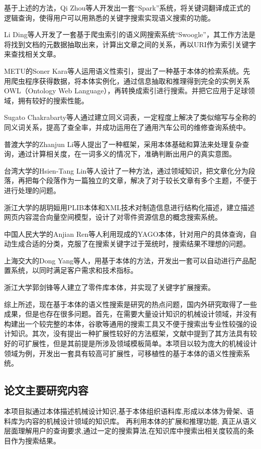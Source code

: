 \documentclass[12pt,a4paper]{article}
\begin{document}
	基于上述的方法，Qi Zhou\cite{14}等人开发出一套“Spark”系统，将关键词翻译成正式的逻辑查询，使得用户可以用熟悉的关键字搜索实现语义搜索的功能。

	Li Ding\cite{15}等人开发了一套基于爬虫索引的语义网搜索系统“Swoogle”，其工作方法是将找到文档的元数据抽取出来，计算出文章之间的关系，再以URI作为索引关键字来查找相关文章。

	METU的Soner Kara\cite{16}等人运用语义性索引，提出了一种基于本体的检索系统。先用爬虫程序获得数据，将本体实例化，通过信息抽取和推理得到完全的实例关系OWL（Ontology Web Language），再转换成索引进行搜索。并把它应用于足球领域，拥有较好的搜索性能。

	Sugato Chakrabarty\cite{17}等人通过建立同义词表，一定程度上解决了类似缩写与全称的同义词关系，提高了查全率，并成功运用在了通用汽车公司的维修查询系统中。

	普渡大学的Zhanjun Li\cite{18}等人提出了一种框架，采用本体基础和算法来处理复杂查询，通过计算相关度，在一词多义的情况下，准确判断出用户的真实意图。

	台湾大学的Hsien-Tang Lin\cite{19}等人设计了一种方法，通过领域知识，把文章化分为段落，再把每个段落作为一篇独立的文章，解决了对于较长文章有多个主题，不便于进行处理的问题。

	浙江大学的胡玥姮用PLIB本体和XML技术对制造信息进行结构化描述，建立描述网页内容混合向量空间模型，设计了对零件资源信息的概念搜索系统。

	中国人民大学的Anjian Ren\cite{20}等人利用现成的YAGO本体，针对用户的具体查询，自动生成合适的分类，克服了在搜索关键字过于笼统时，搜索结果不理想的问题。

	上海交大的Dong Yang\cite{21}等人，用基于本体的方法，开发出一套可以自动进行产品配置系统，以同时满足客户需求和技术指标。

	浙江大学郭剑锋\cite{22}等人建立了零件库本体，并实现了关键字扩展搜索。

	综上所述，现在基于本体的语义性搜索是研究的热点问题，国内外研究取得了一些成果，但是也存在很多问题。首先，在需要大量设计知识的机械设计领域，并没有构建出一个较完整的本体，谷歌等通用的搜索工具又不便于搜索出专业性较强的设计知识。其次，没有提出一种扩展性较好的方法框架，文献\cite{15}中提到了其方法具有较好的可扩展性，但是其前提是所涉及领域模板简单。本项目以较为庞大的机械设计领域为例，开发出一套具有较高可扩展性，可移植性的基于本体的语义性搜索系统。
		
	\subsection{论文主要研究内容}
	本项目拟通过本体描述机械设计知识,基于本体组织语料库,形成以本体为骨架、语料库为内容的机械设计领域的知识库。 再利用本体的扩展和推理功能, 真正从语义层面理解用户的查询要求,通过一定的搜索算法,在知识库中搜索出相关度较高的条目作为搜索结果。
	
\end{document}

